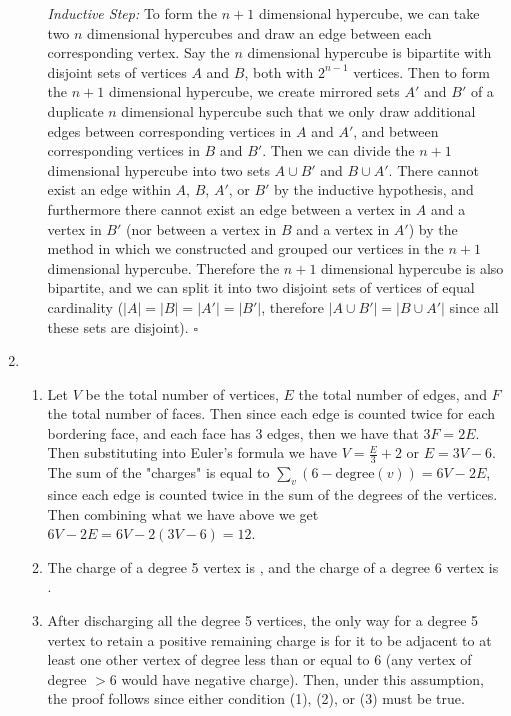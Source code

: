 \begin{enumerate}
\begin{enumerate}
        \textit{Inductive Step:} To form the $n+1$ dimensional hypercube, we can take two $n$ dimensional hypercubes and draw an edge between each corresponding vertex. Say the $n$ dimensional hypercube is bipartite with disjoint sets of vertices $A$ and $B$, both with $2^{n-1}$ vertices. Then to form the $n+1$ dimensional hypercube, we create mirrored sets $A'$ and $B'$ of a duplicate $n$ dimensional hypercube such that we only draw additional edges between corresponding vertices in $A$ and $A'$, and between corresponding vertices in $B$ and $B'$. Then we can divide the $n+1$ dimensional hypercube into two sets $A\cup B'$ and $B\cup A'$. There cannot exist an edge within $A$, $B$, $A'$, or $B'$ by the inductive hypothesis, and furthermore there cannot exist an edge between a vertex in $A$ and a vertex in $B'$ (nor between a vertex in $B$ and a vertex in $A'$) by the method in which we constructed and grouped our vertices in the $n+1$ dimensional hypercube. Therefore the $n+1$ dimensional hypercube is also bipartite, and we can split it into two disjoint sets of vertices of equal cardinality ($|A|=|B|=|A'|=|B'|$, therefore $|A\cup B'|=|B\cup A'|$ since all these sets are disjoint). $\square$
    \end{enumerate}
    
    \item
    \begin{enumerate}
        \setlength{\parskip}{8pt}
        \item Let $V$ be the total number of vertices, $E$ the total number of edges, and $F$ the total number of faces. Then since each edge is counted twice for each bordering face, and each face has 3 edges, then we have that $3F=2E$. Then substituting into Euler's formula we have $V=\frac{E}{3}+2$ or $E=3V-6$. The sum of the "charges" is equal to $\sum_v{(6-\text{degree}{(v)})}=6V-2E$, since each edge is counted twice in the sum of the degrees of the vertices. Then combining what we have above we get $6V-2E=6V-2(3V-6)=\boxed{12}$.
        
        \item The charge of a degree 5 vertex is , and the charge of a degree 6 vertex is .
        
        \item After discharging all the degree 5 vertices, the only way for a degree 5 vertex to retain a positive remaining charge is for it to be adjacent to at least one other vertex of degree less than or equal to 6 (any vertex of degree $>6$ would have negative charge). Then, under this assumption, the proof follows since either condition (1), (2), or (3) must be true.
        

\end{enumerate}
\end{enumerate}

